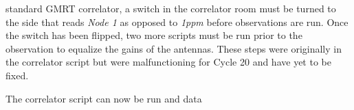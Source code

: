 \documentclass[a4paper,12pt]{article}
\begin{document}
standard GMRT correlator, a switch in the correlator room must be turned to the side that reads \emph{Node 1} as opposed to \emph{1ppm} before observations are run. Once the switch has been flipped, two more scripts must be run prior to the observation to equalize the gains of the antennas. These steps were originally in the correlator script but were malfunctioning for Cycle 20 and have yet to be fixed.

                                                                                                                                                                                                                                                                                                                                                                                                                                                                                                                                                                                                                                                                                                                                                                                                                                                                                                                                                                                                                                                                                                                                                                                                                                                                                                                                                                                                                                                                                                                                                                                                                                                                                                                                                                                                                                                                                                                                                                                                                                                                                                                                                                                                                                                                                                                                                                                                                                                                                                                                                                                                                                                                                                                                                                                                                                                                                                                                The correlator script can now be run and data 
\end{document}

